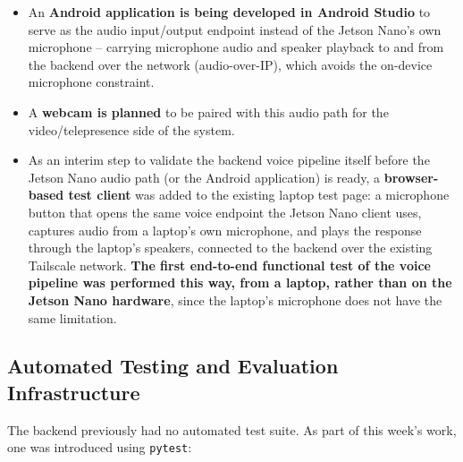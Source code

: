 \documentclass[11pt,a4paper]{article}
\begin{document}
\begin{itemize}
    \item An \textbf{Android application is being developed in Android Studio} to serve as the audio input/output endpoint instead of the Jetson Nano's own microphone -- carrying microphone audio and speaker playback to and from the backend over the network (audio-over-IP), which avoids the on-device microphone constraint.
    \item A \textbf{webcam is planned} to be paired with this audio path for the video/telepresence side of the system.
    \item As an interim step to validate the backend voice pipeline itself before the Jetson Nano audio path (or the Android application) is ready, a \textbf{browser-based test client} was added to the existing laptop test page: a microphone button that opens the same voice endpoint the Jetson Nano client uses, captures audio from a laptop's own microphone, and plays the response through the laptop's speakers, connected to the backend over the existing Tailscale network. \textbf{The first end-to-end functional test of the voice pipeline was performed this way, from a laptop, rather than on the Jetson Nano hardware}, since the laptop's microphone does not have the same limitation.
\end{itemize}

\subsection{Automated Testing and Evaluation Infrastructure}

The backend previously had no automated test suite. As part of this week's work, one was introduced using \texttt{pytest}:
\end{document}
